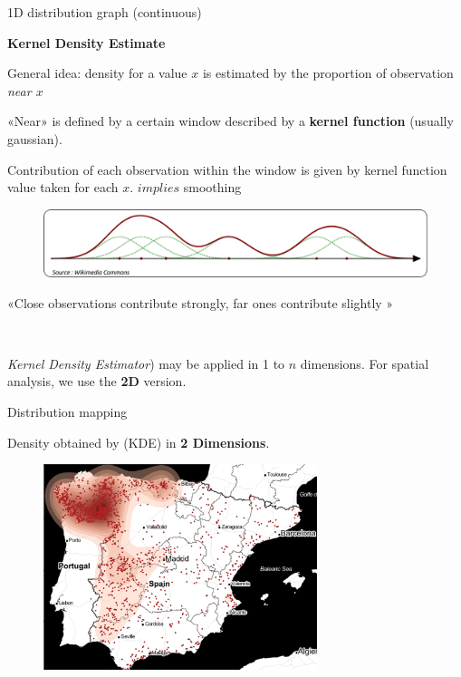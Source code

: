 \begin{frame}{1D distribution graph (continuous)}

\textbf{Kernel Density Estimate}

General idea: density for a value $x$ is estimated by the proportion of observation \textit{near $x$}  

«Near» is defined by a certain window described by a \textbf{kernel function} (usually gaussian).

Contribution of each observation within the window is given by kernel function value taken for each $x$. $implies$ smoothing


\begin{figure}
\includegraphics[width=12cm]{KDE.pdf}
\end{figure}

«Close observations contribute strongly, far ones contribute slightly »

~

\textit{Kernel Density Estimator}) may be applied in 1 to $n$ dimensions. 
For spatial analysis, we use the \textbf{2D} version.

\end{frame}


\begin{frame}{Distribution mapping}

Density obtained by (KDE) in \textbf{2 Dimensions}.

\begin{figure}
  \includegraphics[width=8cm]{Incendies.jpg}
\end{figure}

\end{frame}


